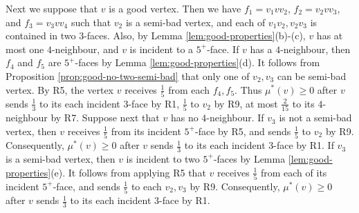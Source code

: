\documentclass[12pt, reqno]{amsart}
\theoremstyle{plain}
\theoremstyle{definition}
\numberwithin{equation}{section}
\begin{document}
Next we suppose that $v$ is a good vertex. Then we have $f_1=v_1vv_2$, $f_2=v_2vv_3$, and $f_3=v_3vv_4$ such that $v_2$ is a semi-bad vertex, and each of $v_1v_2,v_2v_3$ is contained in two $3$-faces. Also, by Lemma \ref{lem:good-properties}(b)-(c), $v$ has at most one $4$-neighbour, and $v$ is incident to a $5^+$-face. 
If $v$ has a $4$-neighbour, then $f_4$ and	$f_5$ are $5^+$-faces by Lemma \ref{lem:good-properties}(d). It follows from Proposition \ref{prop:good-no-two-semi-bad} that only one of $v_2,v_3$ can be semi-bad vertex. By R5, the vertex $v$ receives $\frac{1}{5}$ from each $f_4,f_5$.  Thus $\mu^*(v)\geq 0$ after $v$ sends $\frac{1}{3}$ to its each incident $3$-face by R1, $\frac{1}{5}$ to $v_2$ by R9, at most $\frac{2}{15}$ to its $4$-neighbour by R7. 
Suppose next that $v$ has no $4$-neighbour. If $v_3$ is not a semi-bad vertex, %
then  $v$ receives $\frac{1}{5}$ from its incident $5^+$-face by R5, and sends   $\frac{1}{5}$ to $v_2$ by R9. Consequently,  $\mu^*(v)\geq 0$ after $v$ sends $\frac{1}{3}$ to its each incident $3$-face by R1.
If $v_3$ is a  semi-bad vertex, %
then  $v$ is incident to two $5^+$-faces by Lemma \ref{lem:good-properties}(e).  It follows from applying R5 that $v$ receives $\frac{1}{5}$ from each of its incident $5^+$-face, and sends   $\frac{1}{5}$ to each $v_2,v_3$ by R9. Consequently,  $\mu^*(v)\geq 0$ after $v$ sends $\frac{1}{3}$ to its each incident $3$-face by R1. \medskip


%
\end{document}
